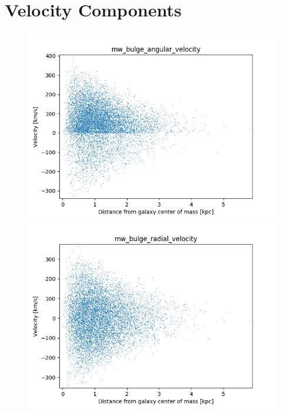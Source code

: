\documentclass[a4paper,12pt, english]{article}
\begin{document}
\section{Velocity Components}
\label{Appendix}
\begin{figure}[!h]
\centering
\begin{minipage}{0.45\textwidth}
  \centering
\includegraphics[width=1\textwidth]{VelocityDistr/mw_bulge_angular_velocity.png}
\end{minipage}
\begin{minipage}{0.45\textwidth}
  \centering
\includegraphics[width=1\textwidth]{VelocityDistr/mw_bulge_radial_velocity.png}
\end{minipage}
\begin{minipage}{0.45\textwidth}

\end{minipage}
\end{figure}
\end{document}
